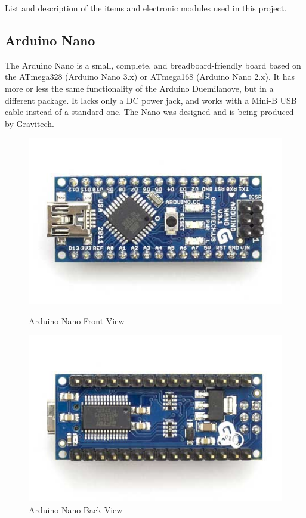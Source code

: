 \documentclass[14pt,a4paper]{extarticle}
\begin{document}
	List and description of the items and electronic modules used in this project. 
	
	\subsection{Arduino Nano}
	
	The Arduino Nano is a small, complete, and breadboard-friendly board based on the ATmega328 (Arduino Nano 3.x) or ATmega168 (Arduino Nano 2.x). It has more or less the same functionality of the Arduino Duemilanove, but in a different package. It lacks only a DC power jack, and works with a Mini-B USB cable instead of a standard one. The Nano was designed and is being produced by Gravitech.
	
			\begin{figure}[H]
	\centering
	\begin{minipage}[b]{0.45\linewidth}
		\includegraphics[width=\textwidth, scale=0.5]{ArduinoNanoFront_3_sm.jpg}
		\caption{Arduino Nano Front View}	
	\end{minipage}
	\quad
	\begin{minipage}[b]{0.45\linewidth}
		\includegraphics[width=\textwidth, scale=0.5]{ArduinoNanoBack_3_sm.jpg}
		\caption{Arduino Nano Back View}
	
	\end{minipage}
	\end{figure}
	
\end{document}
